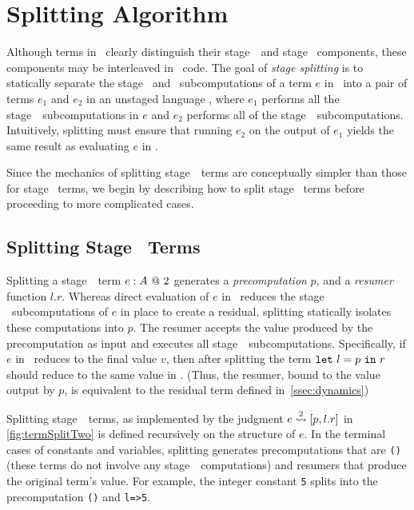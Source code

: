 \section{Splitting Algorithm}
\label{sec:splitting}

Although terms in \lang\ clearly distinguish their stage~\bbone\ and stage
\bbtwo\ components, these components may be interleaved in \lang\ code. The
goal of \emph{stage splitting} is to statically separate the stage \bbone\ and \bbtwo\ subcomputations
of a term $e$ in \lang\ into a pair of
terms $e_1$ and $e_2$ in an unstaged language \langmono, where $e_1$ performs all the
stage~\bbone\ subcomputations in $e$ and $e_2$ performs all of the stage~\bbtwo\ subcomputations.
Intuitively, splitting must ensure that running $e_2$ on the output of $e_1$ yields the same result 
as evaluating $e$ in \lang.

Since the mechanics of splitting stage~\bbtwo\ terms are conceptually simpler than those for stage \bbone\
terms, we begin by describing how to split stage \bbtwo\ terms before proceeding to more complicated cases.

\subsection {Splitting Stage \bbtwo\ Terms}

Splitting a stage~\bbtwo\ term ${e}:{A}~@~ 2$ generates
 a \emph{precomputation} $p$, and a \emph{resumer} function $l.r$. Whereas direct evaluation of $e$ in \lang\ reduces the stage \bbone\ subcomputations
of $e$ in place to create a residual, splitting statically isolates these computations into
$p$.  The resumer accepts the value produced by the precomputation as input
and executes all stage~\bbtwo\ subcomputations.   
Specifically, if $e$ in \lang\ reduces to the final value $v$, 
then after splitting the term ${\tt let}~{l} = {p}~{\tt in}~{r}$ should reduce to the same value in \langmono.
(Thus, the resumer, bound to the value output by $p$, is equivalent to the residual term defined in~\ref{ssec:dynamics})




Splitting stage~\bbtwo\ terms, as implemented by the judgment $e \overset{ 2}\rightsquigarrow
[p,l.r]$ in \cref{fig:termSplitTwo} is defined recursively on the structure of $e$.
In the terminal cases of constants and variables, splitting generates precomputations that are \texttt{()}
(these terms do not involve any stage~\bbone\ computations) and resumers that produce the original term's value.
For example, the integer constant \texttt{5} splits into the precomputation \texttt{()} and \texttt{l=>5}.

